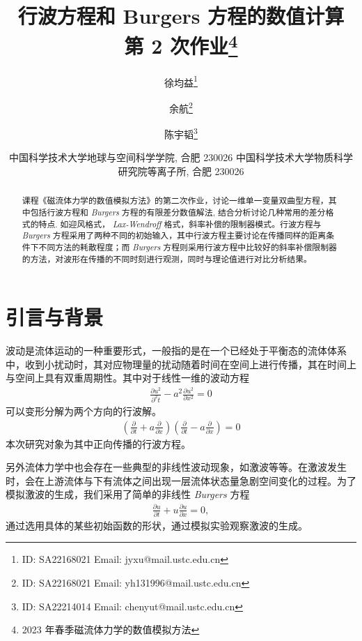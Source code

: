 \documentclass[10.5pt
]{article}
\def\Term{2023 年春季}
\def\Course{磁流体力学的数值模拟方法}
\begin{document}
\title{行波方程和 Burgers 方程的数值计算 \\
  第 2 次作业\footnote{\Term\Course}}

\author{徐均益\footnote{ID: SA22168021 Email: jyxu@mail.ustc.edu.cn}
  \and
  余航\footnote{ID: SA22168021 Email: yh131996@mail.ustc.edu.cn}
  \and
  陈宇韬\footnote{ID: SA22214014 Email: chenyut@mail.ustc.edu.cn}
}

\date{%
\scriptsize%
中国科学技术大学地球与空间科学学院, 合肥 230026
中国科学技术大学物质科学研究院等离子所, 合肥 230026
%
}


\maketitle

\begin{abstract}
课程《磁流体力学的数值模拟方法》的第二次作业，讨论一维单一变量双曲型方程，其中包括行波方程和 \textit{Burgers} 方程的有限差分数值解法,
结合分析讨论几种常用的差分格式的特点. 如迎风格式， \textit{Lax-Wendroff} 格式，斜率补偿的限制器模式。行波方程与 \textit{Burgers} 方程采用了两种不同的初始输入，其中行波方程主要讨论在传播同样的距离条件下不同方法的耗散程度；而 \textit{Burgers} 方程则采用行波方程中比较好的斜率补偿限制器的方法，对波形在传播的不同时刻进行观测，同时与理论值进行对比分析结果。
\end{abstract}

\section{引言与背景}
波动是流体运动的一种重要形式，一般指的是在一个已经处于平衡态的流体体系中，收到小扰动时，其对应物理量的扰动随着时间在空间上进行传播，其在时间上与空间上具有双重周期性。其中对于线性一维的波动方程
\begin{align}
\frac{\partial u^2}{\partial^2 t} - a^2 \frac{\partial u^2}{\partial x^2} = 0
\label{EqnCon}
\end{align}
可以变形分解为两个方向的行波解。
\begin{align}
\left( \frac{\partial }{\partial t} + a \frac{\partial }{\partial x} \right) \left( \frac{\partial }{\partial t} - a \frac{\partial }{\partial x} \right)= 0
\end{align}
本次研究对象为其中正向传播的行波方程。

另外流体力学中也会存在一些典型的非线性波动现象，如激波等等。在激波发生时，会在上游流体与下有流体之间出现一层流体状态量急剧空间变化的过程。为了模拟激波的生成，我们采用了简单的非线性 \textit{Burgers} 方程
\begin{align}
\frac{\partial u}{\partial t} + u \frac{\partial u}{\partial x} = 0, \label{EqnBurgers}
\end{align}
通过选用具体的某些初始函数的形状，通过模拟实验观察激波的生成。
\end{document}
